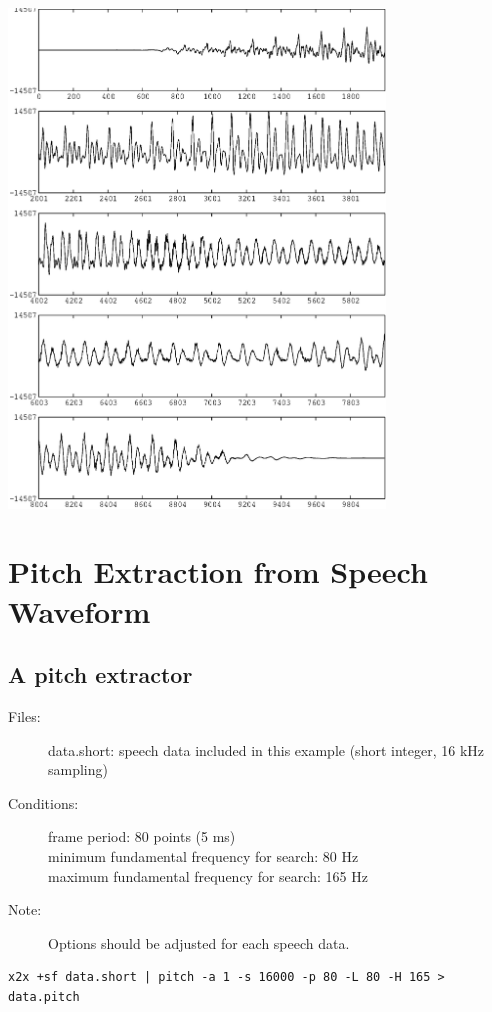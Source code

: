 \documentclass[a4paper,10pt]{article}
\begin{document}
\includegraphics[width=10cm]{eps/data.bcut.gwave.eps}

\section{Pitch Extraction from Speech Waveform}

\subsection{A pitch extractor}

\begin{description}
\item[Files:]
  data.short: speech data included in this example (short integer, 16 kHz sampling)
\item[Conditions:]
  frame period: 80 points (5 ms)\\
  minimum fundamental frequency for search: 80 Hz\\
  maximum fundamental frequency for search: 165 Hz
\item[Note:]
  Options should be adjusted for each speech data.
\end{description}

\begin{verbatim}
x2x +sf data.short | pitch -a 1 -s 16000 -p 80 -L 80 -H 165 > data.pitch
\end{verbatim}
\end{document}
